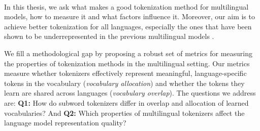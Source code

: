 

~

In this thesis, we ask what makes a good tokenization method for multilingual models, how to measure it and what factors influence it. Moreover, our aim is to achieve better tokenization for all languages, especially the ones that have been shown to be underrepresented in the previous multilingual models \cite{rust_how_2021}. 

We fill a methodological gap by proposing a robust set of metrics for measuring the properties of tokenization methods in the multilingual setting. Our metrics measure whether tokenizers effectively represent meaningful, language-specific tokens in the vocabulary (\textit{vocabulary allocation}) and whether the tokens they learn are shared across languages (\textit{vocabulary overlap}). The questions we address are: \textbf{Q1:} How do subword tokenizers differ in overlap and allocation of learned vocabularies? And \textbf{Q2:} Which properties of multilingual tokenizers affect the language model representation quality?

